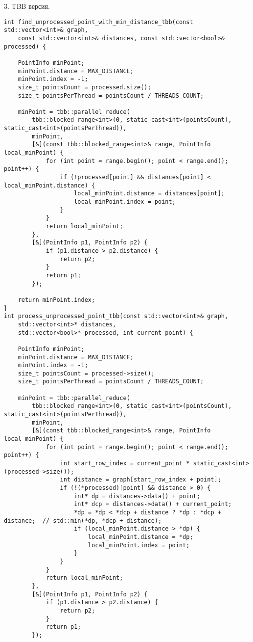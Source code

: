 \documentclass{report}
\begin{document}
\par 3. TBB версия.
\begin{lstlisting}
int find_unprocessed_point_with_min_distance_tbb(const std::vector<int>& graph,
    const std::vector<int>& distances, const std::vector<bool>& processed) {

    PointInfo minPoint;
    minPoint.distance = MAX_DISTANCE;
    minPoint.index = -1;
    size_t pointsCount = processed.size();
    size_t pointsPerThread = pointsCount / THREADS_COUNT;

    minPoint = tbb::parallel_reduce(
        tbb::blocked_range<int>(0, static_cast<int>(pointsCount), static_cast<int>(pointsPerThread)),
        minPoint,
        [&](const tbb::blocked_range<int>& range, PointInfo local_minPoint) {
            for (int point = range.begin(); point < range.end(); point++) {
                if (!processed[point] && distances[point] < local_minPoint.distance) {
                    local_minPoint.distance = distances[point];
                    local_minPoint.index = point;
                }
            }
            return local_minPoint;
        },
        [&](PointInfo p1, PointInfo p2) {
            if (p1.distance > p2.distance) {
                return p2;
            }
            return p1;
        });

    return minPoint.index;
}
int process_unprocessed_point_tbb(const std::vector<int>& graph,
    std::vector<int>* distances,
    std::vector<bool>* processed, int current_point) {

    PointInfo minPoint;
    minPoint.distance = MAX_DISTANCE;
    minPoint.index = -1;
    size_t pointsCount = processed->size();
    size_t pointsPerThread = pointsCount / THREADS_COUNT;

    minPoint = tbb::parallel_reduce(
        tbb::blocked_range<int>(0, static_cast<int>(pointsCount), static_cast<int>(pointsPerThread)),
        minPoint,
        [&](const tbb::blocked_range<int>& range, PointInfo local_minPoint) {
            for (int point = range.begin(); point < range.end(); point++) {
                int start_row_index = current_point * static_cast<int>(processed->size());
                int distance = graph[start_row_index + point];
                if (!(*processed)[point] && distance > 0) {
                    int* dp = distances->data() + point;
                    int* dcp = distances->data() + current_point;
                    *dp = *dp < *dcp + distance ? *dp : *dcp + distance;  // std::min(*dp, *dcp + distance);
                    if (local_minPoint.distance > *dp) {
                        local_minPoint.distance = *dp;
                        local_minPoint.index = point;
                    }
                }
            }
            return local_minPoint;
        },
        [&](PointInfo p1, PointInfo p2) {
            if (p1.distance > p2.distance) {
                return p2;
            }
            return p1;
        });


\end{lstlisting}
\end{document}
